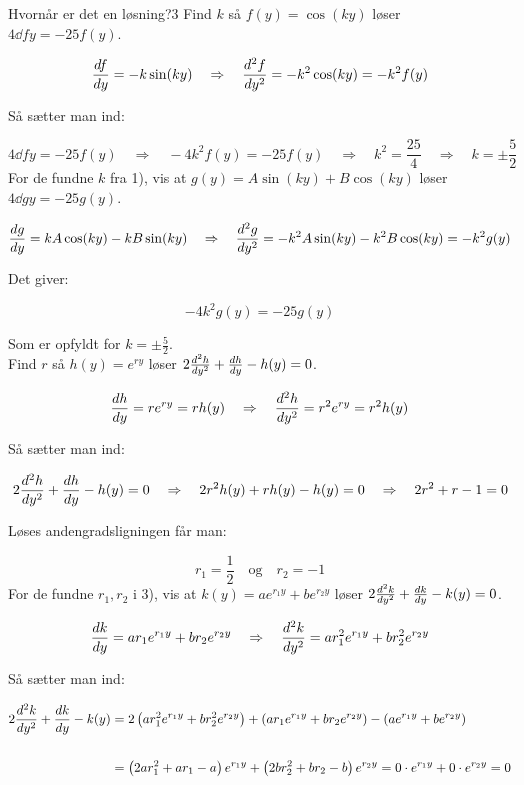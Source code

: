 \begin{opgave}{Hvornår er det en løsning?}{3}
\opg Find $k$ så $f(y) = \cos(ky)$ løser $4 \dd{f}{y} = -25f(y)$.

$${d{f} \over d{y}} = -k\sin(ky) \quad \Rightarrow \quad {d^2{f} \over d{y}^2} = -k^2 \cos(ky) = -k^2 f(y)$$

\vspace{2mm}

Så sætter man ind:

$$4 \dd{f}{y} = -25f(y) \quad \Rightarrow \quad -4k^2 f(y) = -25f(y) \quad \Rightarrow \quad k^2 = \frac{25}{4} \quad \Rightarrow \quad k = \pm \frac{5}{2}$$
\vspace{2mm}
\opg For de fundne $k$ fra 1), vis at $g(y) = A\sin(ky) + B\cos(ky)$ løser $4 \dd{g}{y} = -25g(y)$.

$${d{g} \over d{y}} = kA\cos(ky) - kB\sin(ky) \quad \Rightarrow \quad {d^2{g} \over d{y}^2} = -k^2 A \sin(ky) - k^2 B \cos(ky) = -k^2g(y)$$

\vspace{2mm}

Det giver:

$$-4k^2 g(y) = -25g(y) $$

\vspace{2mm}

Som er opfyldt for $k = \pm \frac{5}{2}$.\\
\opg Find $r$ så $h(y) = e^{ry}$ løser $2 {d^2{h} \over d{y}^2} + {d{h} \over d{y}} - h(y) = 0$.

$${d{h} \over d{y}} = re^{ry} = rh(y) \quad \Rightarrow \quad {d^2{h} \over d{y}^2} = r^2 e^{ry} = r^2 h(y)$$

\vspace{2mm}

Så sætter man ind:

$$2 {d^2{h} \over d{y}^2} + {d{h} \over d{y}} - h(y) = 0 \quad \Rightarrow \quad 2r^2h(y) + rh(y) -h(y) = 0 \quad \Rightarrow \quad 2r^2+r-1=0$$
\vspace{2mm}

Løses andengradsligningen får man:

$$r_1 = \frac{1}{2} \quad \text{og} \quad r_2 = -1$$ 
\vspace{2mm}
\opg For de fundne $r_1,r_2$ i 3), vis at $k(y) = ae^{r_1y} + be^{r_2y}$ løser $2 {d^2{k} \over d{y}^2} + {d{k} \over d{y}} - k(y) = 0$.

$${d{k} \over d{y}} = ar_1e^{r_1y} + br_2e^{r_2y} \quad \Rightarrow \quad {d^2{k} \over d{y}^2} = ar_1^2e^{r_1y} + br_2^2e^{r_2y}$$ 
\vspace{2mm}

Så sætter man ind:

\begin{align*}
2 {d^2{k} \over d{y}^2} + {d{k} \over d{y}} - k(y) &= 2 \left( ar_1^2e^{r_1y} + br_2^2e^{r_2y}  \right) + \left( ar_1e^{r_1y} + br_2e^{r_2y} \right) - \left( ae^{r_1y} + be^{r_2y} \right)\\\\ 
&= \left( 2ar_1^2 + ar_1 - a \right)e^{r_1y} + \left( 2br_2^2 + br_2 - b \right)e^{r_2y} = 0 \cdot e^{r_1y} + 0 \cdot e^{r_2y} = 0 
\end{align*}
\end{opgave}



